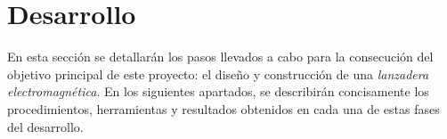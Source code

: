 \section{Desarrollo}
\label{sec:desarrollo}

En esta sección se detallarán los pasos llevados a cabo para la consecución del objetivo principal de este proyecto: el diseño y construcción de una \textit{lanzadera electromagnética}. En los siguientes apartados, se describirán concisamente los procedimientos, herramientas y resultados obtenidos en cada una de estas fases del desarrollo.